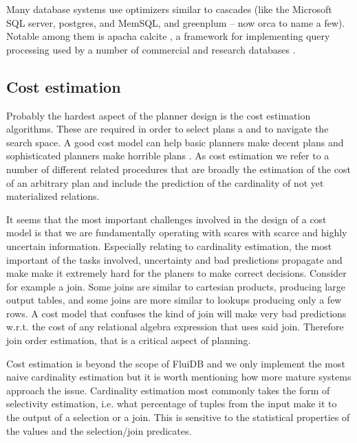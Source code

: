 Many database systems use optimizers similar to cascades (like the
Microsoft SQL server, postgres, and
MemSQL\cite{chenMemSQLQueryOptimizer2016}, and greenplum -- now orca
\cite{solimanOrcaModularQuery2014a} to name a few). Notable among them
is apacha calcite \cite{begoliApacheCalciteFoundational2018}, a
framework for implementing query processing used by a number of
commercial and research databases
\cite{nunesalonsoBuildingPolyglotData2020}.

\subsection{Cost estimation}
\label{sec:org4f8e111}

Probably the hardest aspect of the planner design is the cost
estimation algorithms. These are required in order to select plans a
and to navigate the search space. A good cost model can help basic
planners make decent plans and sophisticated planners make horrible
plans \cite{leisHowGoodAre2015} . As cost estimation we refer to a
number of different related procedures that are broadly the estimation
of the cost of an arbitrary plan and include the prediction of the
cardinality of not yet materialized relations.

It seems that the most important challenges involved in the design of
a cost model is that we are fundamentally operating with scares with
scarce and highly uncertain information. Especially relating to
cardinality estimation, the most important of the tasks involved,
uncertainty and bad predictions propagate and make make it extremely
hard for the planers to make correct decisions. Consider for example a
join. Some joins are similar to cartesian products, producing large
output tables, and some joins are more similar to lookups producing
only a few rows. A cost model that confuses the kind of join will make
very bad predictions w.r.t. the cost of any relational algebra
expression that uses said join. Therefore join order estimation, that
is a critical aspect of planning.

Cost estimation is beyond the scope of FluiDB and we only implement
the most naive cardinality estimation but it is worth mentioning how
more mature systems approach the issue. Cardinality estimation most
commonly takes the form of selectivity estimation, i.e. what
percentage of tuples from the input make it to the output of a
selection or a join. This is sensitive to the statistical
properties of the values and the selection/join predicates.

